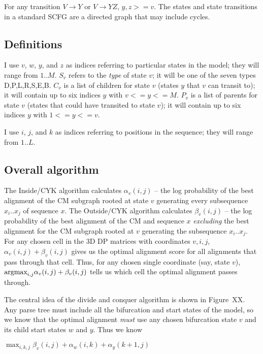 \documentclass[11pt]{article}
\def\argmax{\mbox{\rm{argmax}}}      %
\begin{document}
For any transition $V \rightarrow Y$ or $V \rightarrow YZ$, $y,z >=
v$. The states and state transitions in a standard SCFG are a directed
graph that may include cycles. 

\subsection{Definitions}

I use $v$, $w$, $y$, and $z$ as indices referring to particular states
in the model; they will range from $1..M$. $S_v$ refers to the
\emph{type} of state $v$; it will be one of the seven types
{D,P,L,R,S,E,B}. $C_v$ is a list of children for state $v$ (states $y$
that $v$ can transit to); it will contain up to six indices $y$ with
$v <= y <= M$. $P_v$ is a list of parents for state $v$ (states that
could have transited to state $v$); it will contain up to six indices
$y$ with $1 <= y <= v$.

I use $i$, $j$, and $k$ as indices referring to positions in the
sequence; they will range from $1..L$.

\subsection{Overall algorithm}

The Inside/CYK algorithm calculates $\alpha_v(i,j)$ -- the log
probability of the best alignment of the CM subgraph rooted at state
$v$ generating every subsequence $x_i..x_j$ of sequence $x$.  The
Outside/CYK algorithm calculates $\beta_v(i,j)$ -- the log probability
of the best alignment of the CM and sequence $x$
\emph{excluding} the best alignment for the CM subgraph rooted at
$v$ generating the subsequence $x_i..x_j$.  For any chosen cell in the
3D DP matrices with coordinates $v,i,j$, $\alpha_v(i,j) +
\beta_v(i,j)$ gives us the optimal alignment score for all alignments
that pass through that cell. Thus, for any chosen single coordinate
(say, state $v$), $\argmax_{i,j} \alpha_{v}(i,j) +
\beta_{v}(i,j)$ tells us which cell the optimal alignment
passes through.

The central idea of the divide and conquer algorithm is shown in
Figure~XX. Any parse tree must include all the bifurcation and start
states of the model, so we know that the optimal alignment \emph{must}
use any chosen bifurcation state $v$ and its child start states $w$
and $y$. Thus we know

      $\max_{i,k,j} \beta_{v}(i,j) + \alpha_{w}(i,k) + \alpha_{y}(k+1,j)$
\end{document}
